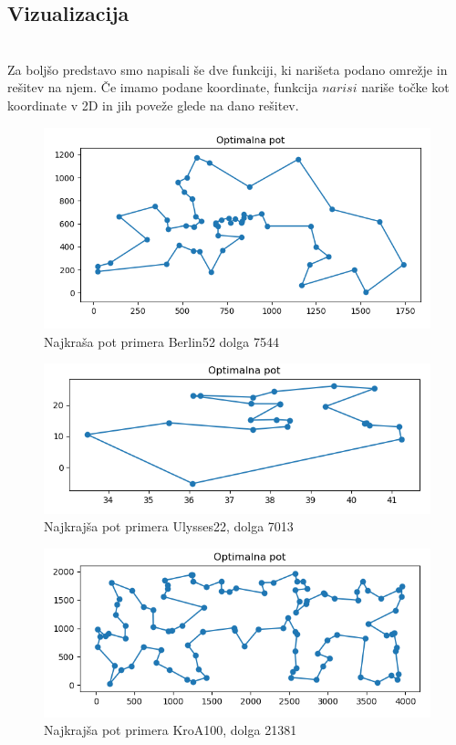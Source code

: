 \documentclass[12pt,a4paper]{amsart}
\theoremstyle{definition} %
\theoremstyle{plain} %
\begin{document}
\subsection{Vizualizacija} ~ \\
Za boljšo predstavo smo napisali še dve funkciji, ki narišeta podano omrežje in rešitev na njem.
Če imamo podane koordinate, funkcija $narisi$ nariše točke kot koordinate v 2D in jih poveže glede na dano rešitev.
\begin{figure}[H]
\caption{Najkraša pot primera Berlin52 dolga 7544}
\centering
\includegraphics[scale =0.5]{berlin_7544}
\end{figure}

\begin{figure}[H]
\caption{Najkrajša pot primera Ulysses22, dolga 7013}
\centering
\includegraphics[scale =0.5]{ulysses22_7013}
\end{figure}

\begin{figure}[H]
\caption{Najkrajša pot primera KroA100, dolga 21381}
\centering
\includegraphics[scale =0.5]{kroA100_21381}
\end{figure}
\end{document}
